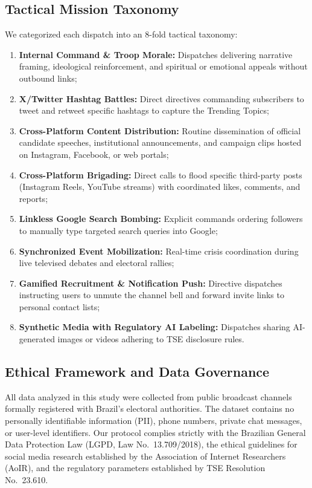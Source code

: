 \documentclass[preprint,12pt]{elsarticle}
\begin{document}
\subsection{Tactical Mission Taxonomy}
We categorized each dispatch into an 8-fold tactical taxonomy:
\begin{enumerate}
    \item \textbf{Internal Command \& Troop Morale:} Dispatches delivering narrative framing, ideological reinforcement, and spiritual or emotional appeals without outbound links;
    \item \textbf{X/Twitter Hashtag Battles:} Direct directives commanding subscribers to tweet and retweet specific hashtags to capture the Trending Topics;
    \item \textbf{Cross-Platform Content Distribution:} Routine dissemination of official candidate speeches, institutional announcements, and campaign clips hosted on Instagram, Facebook, or web portals;
    \item \textbf{Cross-Platform Brigading:} Direct calls to flood specific third-party posts (Instagram Reels, YouTube streams) with coordinated likes, comments, and reports;
    \item \textbf{Linkless Google Search Bombing:} Explicit commands ordering followers to manually type targeted search queries into Google;
    \item \textbf{Synchronized Event Mobilization:} Real-time crisis coordination during live televised debates and electoral rallies;
    \item \textbf{Gamified Recruitment \& Notification Push:} Directive dispatches instructing users to unmute the channel bell and forward invite links to personal contact lists;
    \item \textbf{Synthetic Media with Regulatory AI Labeling:} Dispatches sharing AI-generated images or videos adhering to TSE disclosure rules.
\end{enumerate}

\subsection{Ethical Framework and Data Governance}
All data analyzed in this study were collected from public broadcast channels formally registered with Brazil's electoral authorities. The dataset contains no personally identifiable information (PII), phone numbers, private chat messages, or user-level identifiers. Our protocol complies strictly with the Brazilian General Data Protection Law (LGPD, Law No.\ 13.709/2018), the ethical guidelines for social media research established by the Association of Internet Researchers (AoIR), and the regulatory parameters established by TSE Resolution No.\ 23.610.
\end{document}
